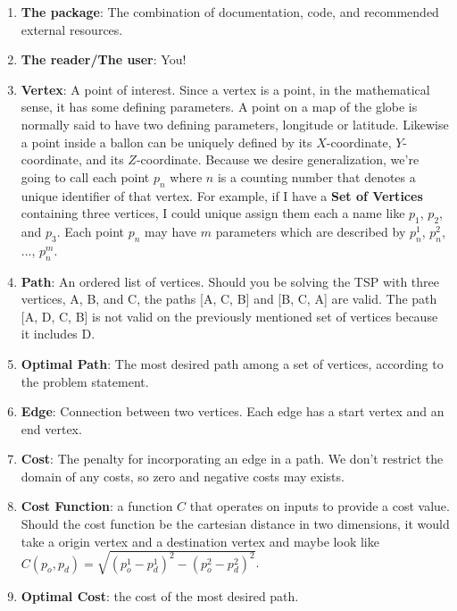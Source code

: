 \documentclass[12pt]{article}
\begin{document}
\begin{enumerate}

\item \textbf{The package}: The combination of documentation, code, and recommended external resources.

\item \textbf{The reader/The user}: You!

\item \textbf{Vertex}: A point of interest.  Since a vertex is a point, in the mathematical sense, it has some defining parameters.  A point on a map of the globe is normally said to have two defining parameters, longitude or latitude.  Likewise a point inside a ballon can be uniquely defined by its $X$-coordinate, $Y$-coordinate, and its $Z$-coordinate.  Because we desire generalization, we're going to call each point $p_n$ where $n$ is a counting number that denotes a unique identifier of that vertex.  For example, if I have a \textbf{Set of Vertices} containing three vertices, I could unique assign them each a name like $p_1$, $p_2$, and $p_3$.  Each point $p_n$  may have $m$ parameters which are described by $p_n^1$, $p_n^2$, ..., $p_n^m$.

\item \textbf{Path}: An ordered list of vertices.  Should you be solving the TSP with three vertices, A, B, and C, the paths [A, C, B] and [B, C, A] are valid.  The path [A, D, C, B] is not valid on the previously mentioned set of vertices because it includes D.  

\item \textbf{Optimal Path}: The most desired path among a set of vertices, according to the problem statement.

\item \textbf{Edge}: Connection between two vertices.  Each edge has a start vertex and an end vertex.

\item \textbf{Cost}:  The penalty for incorporating an edge in a path.  We don't restrict the domain of any costs, so zero and negative costs may exists.

\item \textbf{Cost Function}: a function $C$  that operates on inputs to provide a cost value.   Should the cost function be the cartesian distance in two dimensions, it would take a origin vertex and a destination vertex and maybe look like $C(p_{o}, p_{d}) = \sqrt{(p_{o}^1-p_{d}^1)^2 - (p_{o}^2-p_{d}^2)^2} $.  

\item \textbf{Optimal Cost}: the cost of the most desired path.

\end{enumerate}
\end{document}
